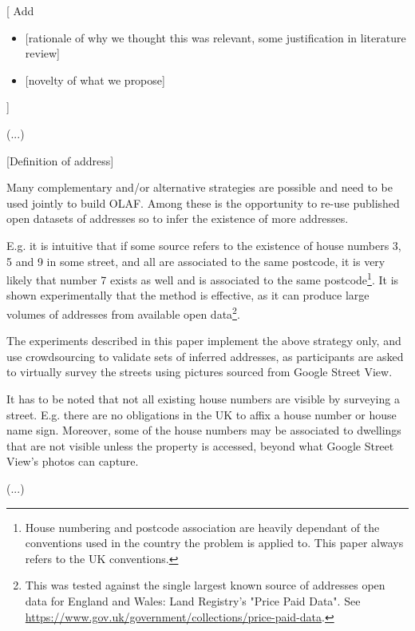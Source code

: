 \documentclass{llncs}
\begin{document}
{[}
Add
\begin{itemize}
	\item {[}rationale of why we thought this was relevant, some justification in literature review{]}
	\item {[}novelty of what we propose{]}
\end{itemize}
{]}

{(}...{)}

{[}Definition of address{]}

Many complementary and/or alternative strategies are possible and need to be used jointly to build OLAF. Among these is the opportunity to re-use published open datasets of addresses so to infer the existence of more addresses. 

E.g. it is intuitive that if some source refers to the existence of house numbers 3, 5 and 9 in some street, and all are associated to the same postcode, it is very likely that number 7 exists as well and is associated to the same postcode\footnote{House numbering and postcode association are heavily dependant of the conventions used in the country the problem is applied to. This paper always refers to the UK conventions.}. It is shown experimentally that the method is effective, as it can produce large volumes of addresses from available open data\footnote{This was tested against the single largest known source of addresses open data for England and Wales: Land Registry's "Price Paid Data". See \url{https://www.gov.uk/government/collections/price-paid-data}.}.

The experiments described in this paper implement the above strategy only, and  use crowdsourcing to validate sets of inferred addresses, as participants are asked to virtually survey the streets using pictures sourced from Google Street View.

It has to be noted that not all existing house numbers are visible by surveying a street. E.g. there are no obligations in the UK to affix a house number or house name sign. Moreover, some of the house numbers may be associated to dwellings that are not visible unless the property is accessed, beyond what Google Street View's photos can capture.

{(}...{)}
\end{document}
